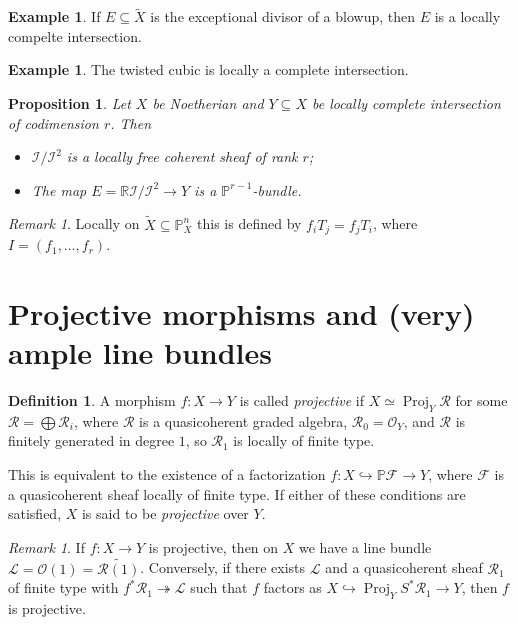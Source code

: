 \documentclass[leqno, openany]{memoir}
\newtheorem{prop}[thm]{Proposition}
\theoremstyle{definition}
\newtheorem{defn}[thm]{Definition}
\newtheorem{exm}[thm]{Example}
\theoremstyle{remark}
\newtheorem{rmk}[thm]{Remark}
\theoremstyle{plain}
\theoremstyle{definition}
\theoremstyle{remark}
\newcommand{\R}{\mathbb{R}}
\renewcommand{\P}{\mathbb{P}}
\newcommand{\mc}[1]{\mathcal{#1}}
\newcommand{\wt}[1]{\widetilde{#1}}
\DeclareMathOperator{\Proj}{Proj}
\begin{document}
\begin{exm} If $E \subseteq \wt{X}$ is the exceptional divisor of a blowup,
then $E$ is a locally compelte intersection.  \end{exm}

\begin{exm} The twisted cubic is locally a complete intersection.  \end{exm}

\begin{prop} Let $X$ be Noetherian and $Y \subseteq X$ be locally complete
    intersection of codimension $r$. Then \begin{itemize} \item $\mc{I} /
        \mc{I}^2$ is a locally free coherent sheaf of rank $r$; \item The map
        $E = \R \mc{I}/\mc{I}^2 \to Y$ is a $\P^{r-1}$-bundle.  \end{itemize}
    \end{prop}

\begin{rmk} Locally on $\wt{X} \subseteq \P^n_X$ this is defined by $f_i T_j =
f_j T_i$, where $I = (f_1, \ldots, f_r)$.  \end{rmk}

\section{Projective morphisms and (very) ample line bundles}%
\label{sec:projective_morphisms_and_very_ample_line_bundles}

\begin{defn} A morphism $f \colon X \to Y$ is called \textit{projective} if $X
    \simeq \Proj_Y \mc{R}$ for some $\mc{R} = \bigoplus \mc{R}_i$, where
    $\mc{R}$ is a quasicoherent graded algebra, $\mc{R}_0 = \mc{O}_Y$, and
    $\mc{R}$ is finitely generated in degree $1$, so $\mc{R}_1$ is locally of
    finite type.  \end{defn}

This is equivalent to the existence of a factorization $f \colon X
\hookrightarrow \P \mc{F} \to Y$, where $\mc{F}$ is a quasicoherent sheaf
locally of finite type. If either of these conditions are satisfied, $X$ is
said to be \textit{projective} over $Y$.

\begin{rmk} If $f \colon X \to Y$ is projective, then on $X$ we have a line
    bundle $\mc{L} = \mc{O}(1) = \wt{\mc{R}(1)}$. Conversely, if there exists
    $\mc{L}$ and a quasicoherent sheaf $\mc{R}_1$ of finite type with $f^*
    \mc{R}_1 \twoheadrightarrow \mc{L}$ such that $f$ factors as $X
    \hookrightarrow \Proj_Y S^* \mc{R}_1 \to Y$, then $f$ is projective.
\end{rmk}
\end{document}
